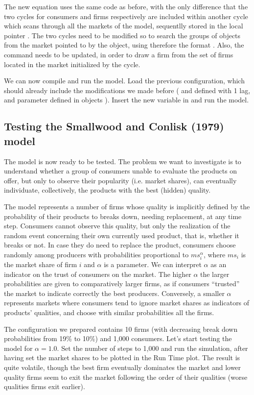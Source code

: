 \documentclass [11pt,a4paper] {book}
\begin{document}
The new equation uses the same code as before, with the only difference that the two cycles for consumers and firms respectively are included within another cycle which scans through all the markets of the model, sequentlly stored in the local pointer . The two cycles need to be modified so to search the groups of objects from the market pointed to by the  object, using therefore the format . Also, the command  needs to be updated, in order to draw a firm from the set of firms located in the market initialized by the cycle. 

We can now compile and run the model. Load the previous configuration, which should already include the modifications we made before ( and  defined with 1 lag, and parameter  defined in objects ). Insert the new variable  in  and run the model.

\subsection{Testing the Smallwood and Conlisk (1979) model}
The model is now ready to be tested. The problem we want to investigate is to understand whether a group of consumers unable to evaluate the products on offer, but only to observe their popularity (i.e. market shares), can eventually individuate, collectively, the products with the best (hidden) quality. 

The model represents a number of firms whose quality is implicitly defined by the probability of their products to breaks down, needing replacement, at any time step. Consumers cannot observe this quality, but only the realization of the random event concerning their own currently used product, that is, whether it breaks or not. In case they do need to replace the product, consumers choose randomly among producers with probabilities proportional to $ms_i^\alpha$, where $ms_i$ is the market share of firm $i$ and $\alpha$ is a parameter. We can interpret $\alpha$ as an indicator on the trust of consumers on the market. The higher $\alpha$ the larger probabilities are given to comparatively larger firms, as if consumers ``trusted'' the market to indicate correctly the best producers. Conversely, a smaller $\alpha$ represents markets where consumers tend to ignore market shares as indicators of products' qualities, and choose with similar probabilities all the firms. 

The configuration we prepared contains 10 firms (with decreasing break down probabilities from 19\% to 10\%) and 1,000 consumers. Let's start testing the model for $\alpha=1.0$. Set the number of steps to 1,000 and run the simulation, after having set the market shares to be plotted in the Run Time plot. The result is quite volatile, though the best firm eventually dominates the market and lower quality firms seem to exit the market following the order of their qualities (worse qualities firms exit earlier).
\end{document}
